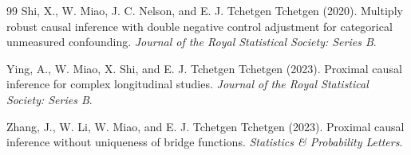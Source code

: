 \documentclass[11pt]{article}
\theoremstyle{definition}
\theoremstyle{plain}
\theoremstyle{remark}
\begin{document}
\begin{thebibliography}{99}
Shi, X., W. Miao, J. C. Nelson, and E. J. Tchetgen Tchetgen (2020).
Multiply robust causal inference with double negative control adjustment for categorical unmeasured confounding.
\emph{Journal of the Royal Statistical Society: Series B}.

Ying, A., W. Miao, X. Shi, and E. J. Tchetgen Tchetgen (2023).
Proximal causal inference for complex longitudinal studies.
\emph{Journal of the Royal Statistical Society: Series B}.

Zhang, J., W. Li, W. Miao, and E. J. Tchetgen Tchetgen (2023).
Proximal causal inference without uniqueness of bridge functions.
\emph{Statistics \& Probability Letters}.
\end{thebibliography}
\end{document}
